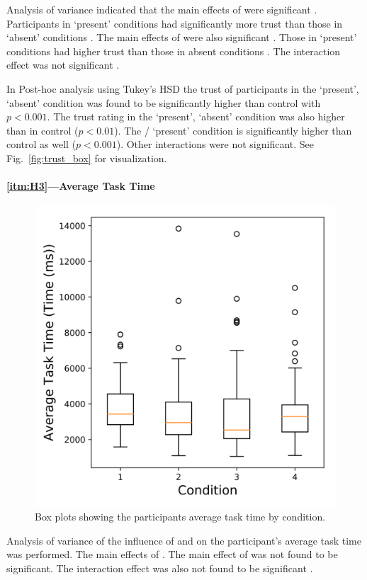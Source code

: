 Analysis of variance indicated that the main effects of \xQ{} were significant . Participants in \xQ{} `present' conditions  had significantly more trust than those in \xQ{} `absent' conditions . The main effects of \xO{} were also significant . Those in \xO{} `present' conditions  had higher trust than those in \xO{} absent conditions . The interaction effect was not significant .

In Post-hoc analysis using Tukey's HSD the trust of participants in the \xQ{} `present', \xO{} `absent' condition  was found to be significantly higher than control  with $p<0.001$. The trust rating in the \xO{} `present', \xQ{} `absent' condition  was also higher than in control ($p<0.01$). The \xQ/\xO{} `present' condition  is significantly higher than control as well ($p<0.001$). Other interactions were not significant. See Fig.~\ref{fig:trust_box} for visualization.

\paragraph{\ref{itm:H3}---Average Task Time}
       \begin{figure}[tb]
            \centering
            \includegraphics[width=0.8\linewidth]{Figures/avg_time_box.png}
            \caption{Box plots showing the participants average task time by condition.}
            \label{fig:time_box}
       \end{figure}
Analysis of variance of the influence of \xQ{} and \xO{} on the participant's average task time was performed. The main effects of \xQ{} . The main effect of \xO{}  was not found to be significant. The interaction effect was also not found to be significant .

